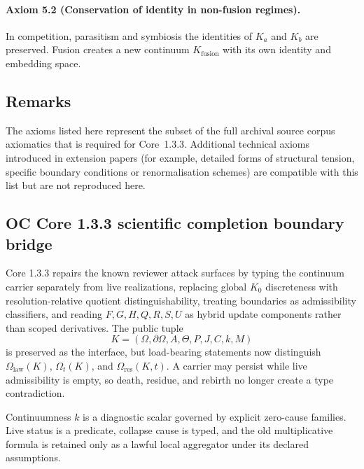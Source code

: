 \paragraph{Axiom 5.2 (Conservation of identity in non-fusion regimes).}
In competition, parasitism and symbiosis the identities of \(K_a\) and \(K_b\)
are preserved.  Fusion creates a new continuum \(K_{\mathrm{fusion}}\) with its
own identity and embedding space.

\subsection{Remarks}

The axioms listed here represent the subset of the full archival source corpus axiomatics
that is required for Core~1.3.3. Additional technical axioms introduced in
extension papers (for example, detailed forms of structural tension, specific
boundary conditions or renormalisation schemes) are compatible with this list
but are not reproduced here.


\subsection{OC Core 1.3.3 scientific completion boundary bridge}
\label{sec:oc133-scientific-closure-bridge}

Core 1.3.3 repairs the known reviewer attack surfaces by typing the continuum
carrier separately from live realizations, replacing global \(K_0\)
discreteness with resolution-relative quotient distinguishability, treating
boundaries as admissibility classifiers, and reading \(F,G,H,Q,R,S,U\) as
hybrid update components rather than scoped derivatives.  The public tuple
\[
K=(\Omega,\partial\Omega,A,\Theta,P,J,C,k,M)
\]
is preserved as the interface, but load-bearing statements now distinguish
\(\Omega_{\mathrm{law}}(K)\), \(\Omega_t(K)\), and
\(\Omega_{\mathrm{res}}(K,t)\).  A carrier may persist while live admissibility
is empty, so death, residue, and rebirth no longer create a type contradiction.

Continuumness \(k\) is a diagnostic scalar governed by explicit zero-cause
families.  Live status is a predicate, collapse cause is typed, and the old
multiplicative formula is retained only as a lawful local aggregator under its
declared assumptions.
